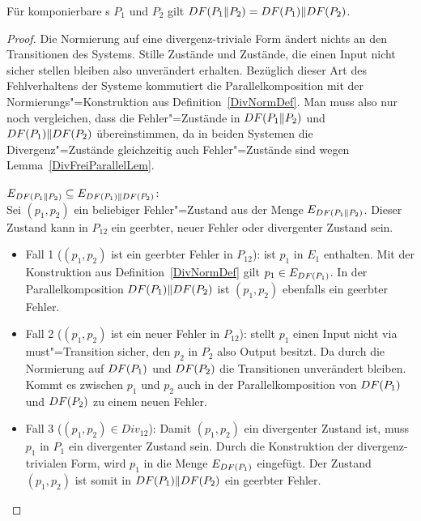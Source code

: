 \begin{Lem}
  \label{ParallDivNormKommLem}
  Für komponierbare \MEIO{}s $P_1$ und $P_2$ gilt $DF (P_1\|P_2) = DF (P_1)\|
  DF (P_2)$.
\end{Lem}
\begin{proof}
  Die Normierung auf eine divergenz-triviale Form ändert nichts an den
  Transitionen des Systems. Stille Zustände und Zustände, die einen Input nicht
  sicher stellen bleiben also unverändert erhalten. Bezüglich dieser Art des
  Fehlverhaltens der Systeme kommutiert die Parallelkomposition mit der
  Normierungs"=Konstruktion aus Definition~\ref{DivNormDef}. Man muss also nur
  noch vergleichen, dass die Fehler"=Zustände in $DF (P_1\|P_2)$ und $DF
  (P_1)\| DF (P_2)$ übereinstimmen, da in beiden Systemen die
  Divergenz"=Zustände gleichzeitig auch Fehler"=Zustände sind wegen
  Lemma~\ref{DivFreiParallelLem}.

  $E_{DF (P_1\|P_2)} \subseteq E_{DF (P_1)\| DF (P_2)}$:\\
  Sei $(p_1,p_2)$ ein beliebiger Fehler"=Zustand aus der Menge $E_{DF
  (P_1\|P_2)}$. Dieser Zustand kann in $P_{12}$ ein geerbter, neuer Fehler oder
  divergenter Zustand sein.
  \begin{itemize}
    \item Fall 1 ($(p_1,p_2)$ ist ein geerbter Fehler in $P_{12}$): \OBdA{} ist
      $p_1$ in $E_1$ enthalten. Mit der Konstruktion aus
      Definition~\ref{DivNormDef} gilt $p_1\in E_{DF (P_1)}$. In der
      Parallelkomposition $DF (P_1)\|DF (P_2)$ ist $(p_1,p_2)$ ebenfalls ein
      geerbter Fehler.
    \item Fall 2 ($(p_1,p_2)$ ist ein neuer Fehler in $P_{12}$): \OBdA{} stellt
      $p_1$ einen Input nicht via must"=Transition sicher, den $p_2$ in $P_2$
      also Output besitzt. Da durch die Normierung auf $DF (P_1)$ und $DF
      (P_2)$ die Transitionen unverändert bleiben. Kommt es zwischen $p_1$ und
      $p_2$ auch in der Parallelkomposition von $DF (P_1)$ und $DF (P_2)$ zu
      einem neuen Fehler.
    \item Fall 3 ($(p_1,p_2)\in Div_{12}$): Damit $(p_1,p_2)$ ein divergenter
      Zustand ist, muss \oBdA{} $p_1$ in $P_1$ ein divergenter Zustand sein.
      Durch die Konstruktion der divergenz-trivialen Form, wird $p_1$ in die
      Menge $E_{DF (P_1)}$ eingefügt. Der Zustand $(p_1,p_2)$ ist somit in
      $DF (P_1)\|DF (P_2)$ ein geerbter Fehler.
  \end{itemize}


\end{proof}
